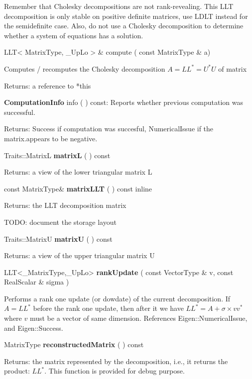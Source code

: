 Remember that Cholesky decompositions are not rank-revealing. This LLT decomposition is only stable on positive definite matrices, use LDLT instead for the semidefinite case. Also, do not use a Cholesky decomposition to determine whether a system of equations has a solution.




\vspace{0.3cm}
LLT< MatrixType, \_UpLo > \& compute  ( const MatrixType \&  a)   

Computes / recomputes the Cholesky decomposition $A = LL^* = U^*U$ of matrix 

Returns: a reference to *this


\vspace{0.3cm}
\textbf{ComputationInfo} info  ( )  const: Reports whether previous computation was successful. 

Returns: Success if computation was succesful, NumericalIssue if the matrix.appears to be negative. 

\vspace{0.3cm}
Traits::MatrixL \textbf{matrixL}  ( )  const 

Returns: a view of the lower triangular matrix L 


\vspace{0.3cm}
const MatrixType\& \textbf{matrixLLT}  ( )  const 
inline  

Returns: the LLT decomposition matrix

TODO: document the storage layout 


\vspace{0.3cm}
Traits::MatrixU \textbf{matrixU}  ( )  const 

Returns: a view of the upper triangular matrix U 


\vspace{0.3cm}
LLT<\_MatrixType,\_UpLo> \textbf{rankUpdate}  ( const VectorType \&  v, const RealScalar \&  sigma )   

Performs a rank one update (or dowdate) of the current decomposition. 
If $A = LL^*$ before the rank one update, then after it we have $LL^* = A + \sigma \times v v^*$ where $v$ must be a vector of same dimension. 
References Eigen::NumericalIssue, and Eigen::Success.

\vspace{0.3cm}
MatrixType \textbf{reconstructedMatrix}  ( )  const 

Returns: the matrix represented by the decomposition, i.e., it returns the product: $L L^*$. This function is provided for debug purpose. 

